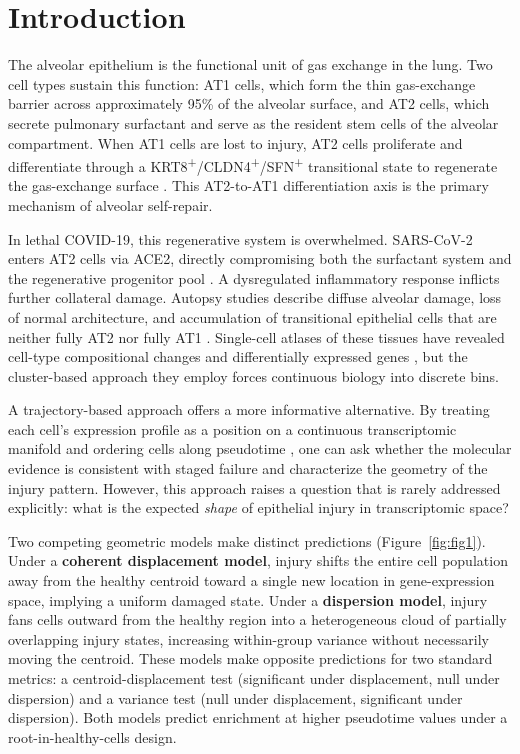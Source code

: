 \documentclass[11pt]{article}
\begin{document}
\section{Introduction}

The alveolar epithelium is the functional unit of gas exchange in the lung. Two cell types sustain this function: AT1 cells, which form the thin gas-exchange barrier across approximately 95\% of the alveolar surface, and AT2 cells, which secrete pulmonary surfactant and serve as the resident stem cells of the alveolar compartment. When AT1 cells are lost to injury, AT2 cells proliferate and differentiate through a KRT8\textsuperscript{+}/CLDN4\textsuperscript{+}/SFN\textsuperscript{+} transitional state to regenerate the gas-exchange surface \citep{Barkauskas2013, Kobayashi2020, Strunz2020}. This AT2-to-AT1 differentiation axis is the primary mechanism of alveolar self-repair.

In lethal COVID-19, this regenerative system is overwhelmed. SARS-CoV-2 enters AT2 cells via ACE2, directly compromising both the surfactant system and the regenerative progenitor pool \citep{Ziegler2020, Hou2020}. A dysregulated inflammatory response inflicts further collateral damage. Autopsy studies describe diffuse alveolar damage, loss of normal architecture, and accumulation of transitional epithelial cells that are neither fully AT2 nor fully AT1 \citep{Borczuk2020, Melms2021}. Single-cell atlases of these tissues have revealed cell-type compositional changes and differentially expressed genes \citep{Melms2021, Delorey2021}, but the cluster-based approach they employ forces continuous biology into discrete bins.

A trajectory-based approach offers a more informative alternative. By treating each cell's expression profile as a position on a continuous transcriptomic manifold and ordering cells along pseudotime \citep{Haghverdi2016, Setty2019}, one can ask whether the molecular evidence is consistent with staged failure and characterize the geometry of the injury pattern. However, this approach raises a question that is rarely addressed explicitly: what is the expected \emph{shape} of epithelial injury in transcriptomic space?

Two competing geometric models make distinct predictions (Figure~\ref{fig:fig1}). Under a \textbf{coherent displacement model}, injury shifts the entire cell population away from the healthy centroid toward a single new location in gene-expression space, implying a uniform damaged state. Under a \textbf{dispersion model}, injury fans cells outward from the healthy region into a heterogeneous cloud of partially overlapping injury states, increasing within-group variance without necessarily moving the centroid. These models make opposite predictions for two standard metrics: a centroid-displacement test (significant under displacement, null under dispersion) and a variance test (null under displacement, significant under dispersion). Both models predict enrichment at higher pseudotime values under a root-in-healthy-cells design.
\end{document}
